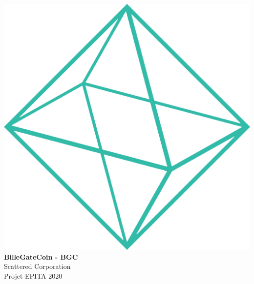 \documentclass{article}
\begin{document}
\makeatletter
    \begin{titlepage}
        \begin{center}
            \pagecolor{background}
            \color{white}
            \includegraphics[width=0.5\linewidth]{assets/shape.png}\\[10ex]
            {\huge \bfseries BilleGateCoin - BGC}\\[2ex] 
            {\LARGE Scattered Corporation}\\[40ex] 

            {\large Projet EPITA 2020}
        \end{center}
    \end{titlepage}
\makeatother
\thispagestyle{empty}

\newpage
\begin{center}
\color{white}
\tableofcontents
\end{center}
\newpage
\pagecolor{white}
\sectionfont{\color{greendark}}  %

\fancyhf{}
\renewcommand{\headrulewidth}{0pt}
\renewcommand{\footrulewidth}{1pt}
\newcommand\bold[1]{\textcolor{green}{\bfseries{#1}}}
\newcommand\boldblack[1]{\textcolor{background}{\bfseries{#1}}}
\renewcommand{\footrule}{\hbox to\headwidth{\color{green}\leaders\hrule height \footrulewidth\hfill}}

\rfoot{\thepage}
\pagestyle{fancy}
\renewcommand\seriesdefault{l}

\end{document}
